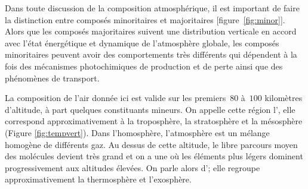 \sk
\begin{finger}
\item Dans toute discussion de la composition atmosphérique, il est important de faire la distinction entre composés minoritaires et majoritaires [figure~\ref{fig:minor}]. Alors que les composés majoritaires suivent une distribution verticale en accord avec l'état énergétique et dynamique de l'atmosphère globale, les composés minoritaires peuvent avoir des comportements très différents qui dépendent à la fois des mécanismes photochimiques de production et de perte ainsi que des phénomènes de transport.
\item La composition de l'air donnée ici est valide sur les premiers~$80$ à~$100$ kilomètres d'altitude, à part quelques constituants mineurs. On appelle cette région l', elle correspond approximativement à la troposphère, la stratosphère et la mésosphère (Figure \ref{fig:tempvert}). Dans l'homosphère, l'atmosphère est un mélange homogène de différents gaz. Au dessus de cette altitude, le libre parcours moyen des molécules devient très grand et on a une  où les éléments plus légers dominent progressivement aux altitudes élevées. On parle alors d'; elle regroupe approximativement la thermosphère et l'exosphère. 
\end{finger}


